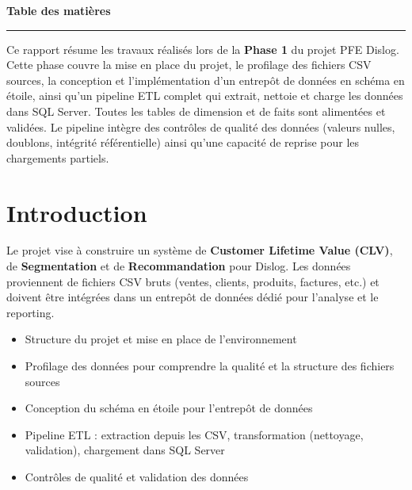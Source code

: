 \documentclass[11pt,a4paper]{article}
\begin{document}
\newpage
\thispagestyle{empty}
\vspace*{1cm}
\begin{center}
{\color{primary}\LARGE\bfseries Table des matières}\\[2pt]
{\color{accent}\rule{4cm}{1.5pt}}
\end{center}
\vspace{0.5cm}
\tableofcontents
\newpage

\begin{sectionbox}[Résumé]
Ce rapport résume les travaux réalisés lors de la \textbf{Phase 1} du projet PFE Dislog. Cette phase couvre la mise en place du projet, le profilage des fichiers CSV sources, la conception et l'implémentation d'un entrepôt de données en schéma en étoile, ainsi qu'un pipeline ETL complet qui extrait, nettoie et charge les données dans SQL Server. Toutes les tables de dimension et de faits sont alimentées et validées. Le pipeline intègre des contrôles de qualité des données (valeurs nulles, doublons, intégrité référentielle) ainsi qu'une capacité de reprise pour les chargements partiels.
\end{sectionbox}

\section{Introduction}

Le projet vise à construire un système de \textbf{Customer Lifetime Value (CLV)}, de \textbf{Segmentation} et de \textbf{Recommandation} pour Dislog. Les données proviennent de fichiers CSV bruts (ventes, clients, produits, factures, etc.) et doivent être intégrées dans un entrepôt de données dédié pour l'analyse et le reporting.

\begin{infobox}
\begin{itemize}[noitemsep,leftmargin=1.2em]
  \item Structure du projet et mise en place de l'environnement
  \item Profilage des données pour comprendre la qualité et la structure des fichiers sources
  \item Conception du schéma en étoile pour l'entrepôt de données
  \item Pipeline ETL : extraction depuis les CSV, transformation (nettoyage, validation), chargement dans SQL Server
  \item Contrôles de qualité et validation des données
\end{itemize}
\end{infobox}
\end{document}

